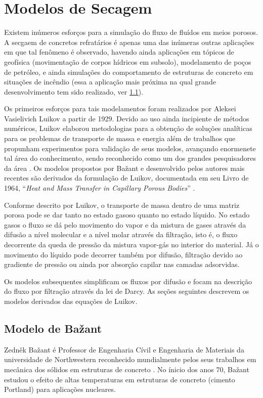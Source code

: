 \section{Modelos de Secagem}\label{modelos}
Existem inúmeros esforços para a simulação do fluxo de fluídos em meios porosos.
A secgaem de concretos refratários é apenas uma das inúmeras outras aplicações
em que tal fenômeno é observado, havendo ainda aplicações em tópicos de geofísica
(movimentação de corpos hídricos em subsolo), modelamento de poços de petróleo,
e ainda simulações do comportamento de estruturas de concreto em situações de
incêndio (essa a aplicação mais próxima na qual grande desenvolvimento tem sido
realizado, ver \ref{sec:bazant}).


Os primeiros esforços para tais modelamentos foram realizados por Aleksei
Vasielivich Luikov \cite{martynenko2010} a partir de 1929. Devido ao uso ainda
incipiente de métodos numéricos, Luikov elaborou metodologias para a obtenção de
soluções analíticas para os problemas de transporte de massa e energia além de
trabalhos que propunham experimentos para validação de seus modelos, avançando
enormenete tal área do conhecimento, sendo reconhecido como um dos grandes
pesquisadores da área \cite{Mikhailov1983}. Os modelos propostos por Ba\v{z}ant
e desenvolvido pelos autores mais recentes são derivados da formulação de
Luikov, documentada em seu Livro de 1964, ``\textit{Heat and Mass Transfer in
  Capillary Porous Bodies}'' \cite{luikov1964heat}.

Conforme descrito por Luikov, o transporte de massa dentro de uma matriz porosa
pode se dar tanto no estado gasoso quanto no estado líquido. No estado gasos o
fluxo se dá pelo movimento do vapor e da mistura de gases através da difusão a
nível molecular e a nível molar através da filtração, isto é, o fluxo decorrente
da queda de pressão da mistura vapor-gás no interior do material. Já o movimento
do líquido pode decorrer também por difusão, filtração devido ao gradiente de
pressão ou ainda por absorção capilar nas camadas adsorvidas.

Os modelos subsequentes simplificam os fluxos por difusão e focam na descrição
do fluxo por filtração através da lei de Darcy. As seções seguintes descrevem os
modelos derivados das equações de Luikov.
    
    
\subsection{Modelo de Ba\v{z}ant}\label{sec:bazant}
Zedn\v{e}k Ba\v{z}ant é Professor de Engenharia Cívil e Engenharia de Materiais
da universidade de Northwestern reconhecido mundialmente pelos seus trabalhos em
mecânica dos sólidos em estruturas de concreto \cite{bundesen2004biography}. No
ínicio dos anos 70, Ba\v{z}ant estudou o efeito de altas temperaturas em
estruturas de concreto (cimento Portland) para aplicações nucleares.
    
